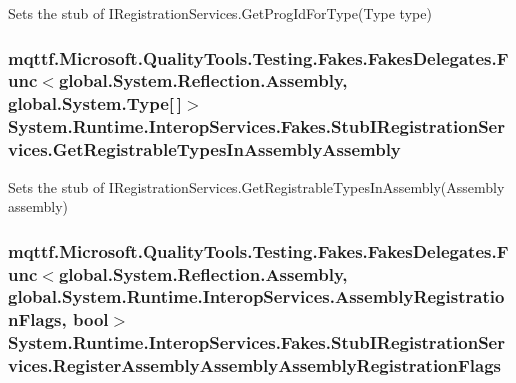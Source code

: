 Sets the stub of I\-Registration\-Services.\-Get\-Prog\-Id\-For\-Type(\-Type type)

\hypertarget{class_system_1_1_runtime_1_1_interop_services_1_1_fakes_1_1_stub_i_registration_services_aee1d3b6893669e7c2edd434b8ff8a850}{
\subsubsection[{Get\-Registrable\-Types\-In\-Assembly\-Assembly}]{\setlength{\rightskip}{0pt plus 5cm}mqttf.\-Microsoft.\-Quality\-Tools.\-Testing.\-Fakes.\-Fakes\-Delegates.\-Func$<$global.\-System.\-Reflection.\-Assembly, global.\-System.\-Type\mbox{[}$\,$\mbox{]}$>$ System.\-Runtime.\-Interop\-Services.\-Fakes.\-Stub\-I\-Registration\-Services.\-Get\-Registrable\-Types\-In\-Assembly\-Assembly}}\label{class_system_1_1_runtime_1_1_interop_services_1_1_fakes_1_1_stub_i_registration_services_aee1d3b6893669e7c2edd434b8ff8a850}


Sets the stub of I\-Registration\-Services.\-Get\-Registrable\-Types\-In\-Assembly(\-Assembly assembly)

\hypertarget{class_system_1_1_runtime_1_1_interop_services_1_1_fakes_1_1_stub_i_registration_services_a9736aeaf58abfa359b4ae1655cdc4b05}{
\subsubsection[{Register\-Assembly\-Assembly\-Assembly\-Registration\-Flags}]{\setlength{\rightskip}{0pt plus 5cm}mqttf.\-Microsoft.\-Quality\-Tools.\-Testing.\-Fakes.\-Fakes\-Delegates.\-Func$<$global.\-System.\-Reflection.\-Assembly, global.\-System.\-Runtime.\-Interop\-Services.\-Assembly\-Registration\-Flags, bool$>$ System.\-Runtime.\-Interop\-Services.\-Fakes.\-Stub\-I\-Registration\-Services.\-Register\-Assembly\-Assembly\-Assembly\-Registration\-Flags}}\label{class_system_1_1_runtime_1_1_interop_services_1_1_fakes_1_1_stub_i_registration_services_a9736aeaf58abfa359b4ae1655cdc4b05}


